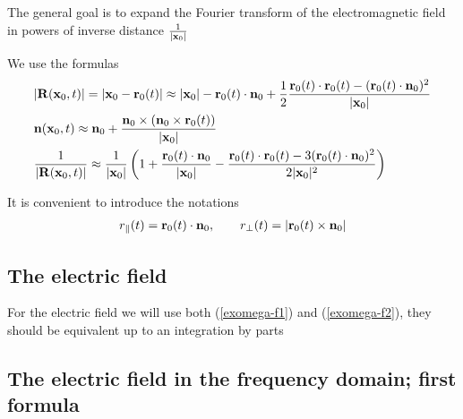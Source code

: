 The general goal is to expand the Fourier transform of the electromagnetic field in powers of inverse distance $\frac1{|{\bf x}_0|}$

We use the formulas
\begin{align}
     & |{\bf R}({\bf x}_0,t)|=|{\bf x}_0-{\bf r}_0(t)|\approx|{\bf x}_0 |- {\bf r}_0(t)\cdot{\bf n}_0  +\frac12\frac{{\bf r}_0(t)\cdot{\bf r}_0(t) -({\bf r}_0(t)\cdot{\bf n}_0)^2}{|{\bf x}_0|}                             \\
     & {\bf n}({\bf x}_0,t) \approx {\bf n}_0 + \frac{{\bf n}_0\times({\bf n}_0\times{\bf r}_0(t))}{|{\bf x}_0|}                                                                                                             \\
     & \frac1{|{\bf R}({\bf x}_0,t)|} \approx \frac1{|{\bf x}_0|}\left(1 + \frac{{\bf r}_0(t)\cdot{\bf n}_0}{|{\bf x}_0|} - \frac{{\bf r}_0(t)\cdot{\bf r}_0(t) - 3 ({\bf r}_0(t)\cdot {\bf n}_0)^2}{2|{\bf x}_0|^2} \right)
\end{align}

It is convenient to introduce the notations
\begin{align}
    { r}_\parallel(t) = {\bf r}_0(t)\cdot{\bf n}_0,\qquad r_\perp(t) = |{\bf r}_0(t)\times{\bf n}_0|
\end{align}
\subsection{The electric field}

For the electric field we will use both (\ref{exomega-f1}) and (\ref{exomega-f2}), they should be equivalent up to an integration by parts

\subsection{The electric field in the frequency domain; first formula}

